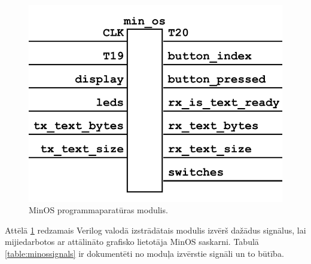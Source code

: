 \begin{figure}[H]
    \includegraphics[width=0.7\linewidth]{assets/min-os-grey.png}
    \centering
    \caption{MinOS programmaparatūras modulis.}
    \label{fig:minos}
\end{figure}

Attēlā \ref{fig:minos} redzamais Verilog valodā izstrādātais modulis izvērš
dažādus signālus, lai mijiedarbotos ar attālināto grafisko lietotāja MinOS
saskarni. Tabulā \ref{table:minossignals} ir dokumentēti no moduļa izvērstie
signāli un to būtība.

